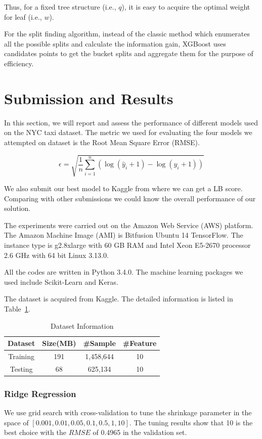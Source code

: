 Thus, for a fixed tree structure (i.e., $q$), it is easy to acquire the optimal weight for leaf (i.e., $w$).

For the split finding algorithm, instead of the classic method which enumerates all the possible splits and calculate the information gain, XGBoost uses candidates points to get the bucket splits and aggregate them for the purpose of efficiency.
 

\section{Submission and Results}
In this section, we will report and assess the performance of different models used on the NYC taxi dataset. The metric we used for evaluating the four models we attempted on dataset is the Root Mean Square Error (RMSE). 

\begin{equation}
\epsilon = \sqrt{\frac{1}{n}\sum_{i=1}^n(\log(\hat{y}_i + 1) - \log(y_i+1))}
\end{equation}

We also submit our best model to Kaggle from where we can get a LB score. Comparing with other submissions we could know the overall performance of our solution. 

The experiments were carried out on the Amazon Web Service (AWS) platform. The Amazon Machine Image (AMI) is Bitfusion Ubuntu 14 TensorFlow. The instance type is g2.8xlarge with 60 GB RAM and Intel Xeon E5-2670 processor 2.6 GHz with 64 bit Linux 3.13.0.

All the codes are written in Python 3.4.0. The machine learning packages we used include Scikit-Learn and Keras.

The dataset is acquired from Kaggle. The detailed information is listed in Table~\ref{tab:dataset}.

\begin{table}[!htbp]
	\caption{Dataset Information}
	\begin{tabular}{cccc}
		\toprule
		Dataset & Size(MB) & \#Sample & \#Feature \\
		\midrule
		Training & 191& 1,458,644& 10 \\
		Testing & 68 & 625,134& 10\\
		\bottomrule
	\end{tabular}
\label{tab:dataset}
\end{table}

\subsubsection{Ridge Regression}
We use grid search with cross-validation to tune the shrinkage parameter in the space of $[0.001, 0.01, 0.05, 0.1, 0.5, 1, 10]$. The tuning results show that 10 is the best choice with the $RMSE$ of 0.4965 in the validation set.

